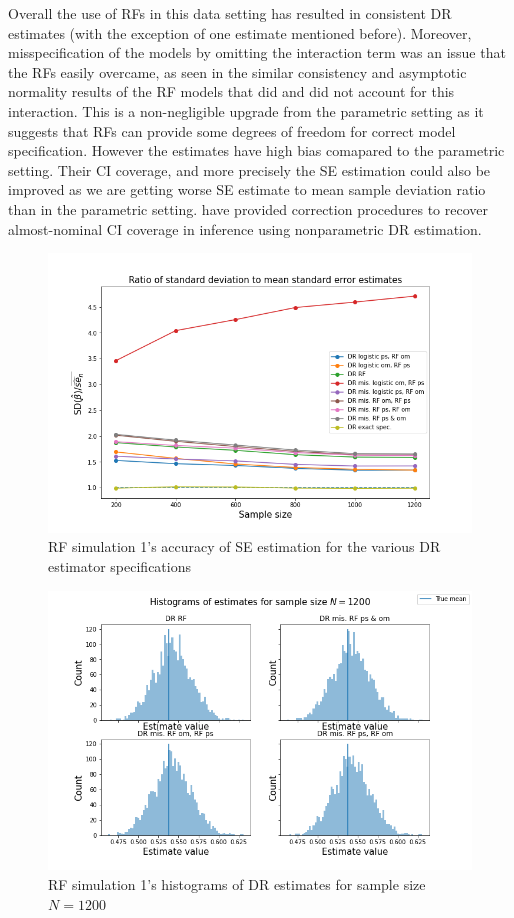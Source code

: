 \documentclass[12pt,twoside]{article}
\begin{document}
Overall the use of RFs in this data setting has resulted in consistent DR estimates (with the exception of one estimate mentioned before). Moreover, misspecification of the models by omitting the interaction term was an issue that the RFs easily overcame, as seen in the similar consistency and asymptotic normality results of the RF models that did and did not account for this interaction. This is a non-negligible upgrade from the parametric setting as it suggests that RFs can provide some degrees of freedom for correct model specification. However the estimates have high bias comapared to the parametric setting. Their CI coverage, and more precisely the \cite{lunceford_davidian} SE estimation could also be improved as we are getting worse SE estimate to mean sample deviation ratio than in the parametric setting. \cite{benkeser2017} have provided correction procedures to recover almost-nominal CI coverage in inference using nonparametric DR estimation.

\begin{figure}[h!]
    \centering
    \includegraphics[width = 0.9\columnwidth]{figures/SERF.png}
    \caption{RF simulation 1's accuracy of \citet{lunceford_davidian} SE estimation for the various DR estimator specifications}
    \label{figSERF}
\end{figure}

\begin{figure}[h!]
    \centering
    \includegraphics[width = 0.9\columnwidth]{figures/histRF.png}
    \caption{RF simulation 1's histograms of DR estimates for sample size $N = 1200$}
    \label{fighistRF}
\end{figure}
\end{document}
